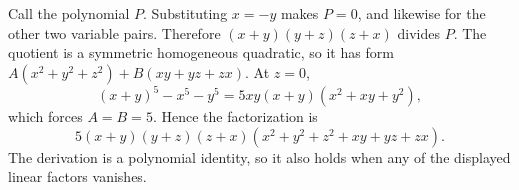 Call the polynomial $P$. Substituting $x=-y$ makes $P=0$, and likewise for the other two variable pairs. Therefore $(x+y)(y+z)(z+x)$ divides $P$. The quotient is a symmetric homogeneous quadratic, so it has form $A(x^2+y^2+z^2)+B(xy+yz+zx)$. At $z=0$,\[(x+y)^5-x^5-y^5=5xy(x+y)(x^2+xy+y^2),\]which forces $A=B=5$. Hence the factorization is\[\boxed{5(x+y)(y+z)(z+x)(x^2+y^2+z^2+xy+yz+zx)}.\]The derivation is a polynomial identity, so it also holds when any of the displayed linear factors vanishes.
